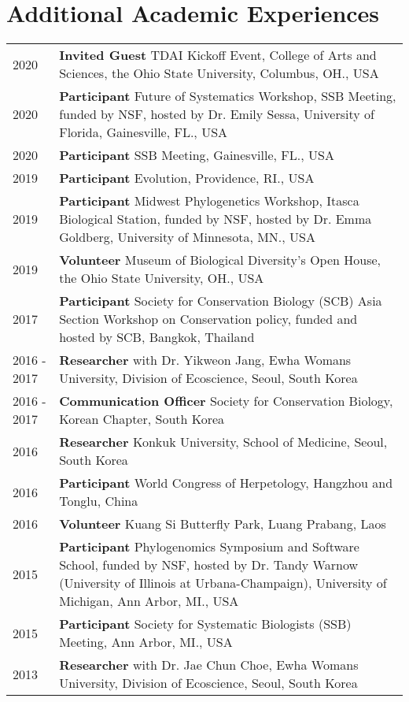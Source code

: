 \documentclass[10pt]{article}
\begin{document}
\section*{Additional Academic Experiences}

\begin{longtable}{p{}  p{}}

2020 &	\textbf{Invited Guest} TDAI Kickoff Event, College of Arts and Sciences, the Ohio State University, Columbus, OH., USA\\
2020 &	\textbf{Participant} Future of Systematics Workshop, SSB Meeting, funded by NSF, hosted by Dr. Emily Sessa, University of Florida, Gainesville, FL., USA\\
2020 &	\textbf{Participant} SSB Meeting, Gainesville, FL., USA\\
2019 &  \textbf{Participant} Evolution, Providence, RI., USA\\
2019 &	\textbf{Participant} Midwest Phylogenetics Workshop, Itasca Biological Station, funded by NSF, hosted by Dr. Emma Goldberg, University of Minnesota, MN., USA\\
2019 & \textbf{Volunteer} Museum of Biological Diversity’s Open House, the Ohio State University, OH., USA\\
2017 &	\textbf{Participant} Society for Conservation Biology (SCB) Asia Section Workshop on Conservation policy, funded and hosted by SCB, Bangkok, Thailand\\
2016 - 2017 & \textbf{Researcher} with Dr. Yikweon Jang, Ewha Womans University, Division of Ecoscience, Seoul, South Korea\\
2016 - 2017 &	\textbf{Communication Officer} Society for Conservation Biology, Korean Chapter, South Korea\\
2016 &	\textbf{Researcher} Konkuk University, School of Medicine, Seoul, South Korea\\
2016 &	\textbf{Participant} World Congress of Herpetology, Hangzhou and Tonglu, China\\
2016 &	\textbf{Volunteer} Kuang Si Butterfly Park, Luang Prabang, Laos\\
2015 &	\textbf{Participant} Phylogenomics Symposium and Software School, funded by NSF, hosted by Dr. Tandy Warnow (University of Illinois at Urbana-Champaign), University of Michigan, Ann Arbor, MI., USA\\
2015 &	\textbf{Participant} Society for Systematic Biologists (SSB) Meeting, Ann Arbor, MI., USA\\
2013 &	\textbf{Researcher} with Dr. Jae Chun Choe, Ewha Womans University, Division of Ecoscience, Seoul, South Korea\\

\end{longtable}
\end{document}
